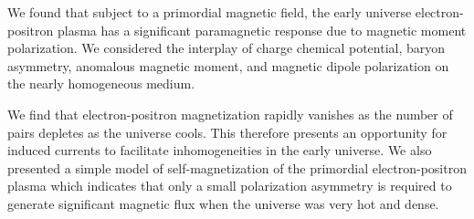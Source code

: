 We found that subject to a primordial magnetic field, the early universe electron-positron plasma has a significant paramagnetic response due to magnetic moment polarization. We considered the interplay of charge chemical potential, baryon asymmetry, anomalous magnetic moment, and magnetic dipole polarization on the nearly homogeneous medium.

We find that electron-positron magnetization rapidly vanishes as the number of pairs depletes as the universe cools. This therefore presents an opportunity for induced currents to facilitate inhomogeneities in the early universe. We also presented a simple model of self-magnetization of the primordial electron-positron plasma which indicates that only a small polarization asymmetry is required to generate significant magnetic flux when the universe was very hot and dense.